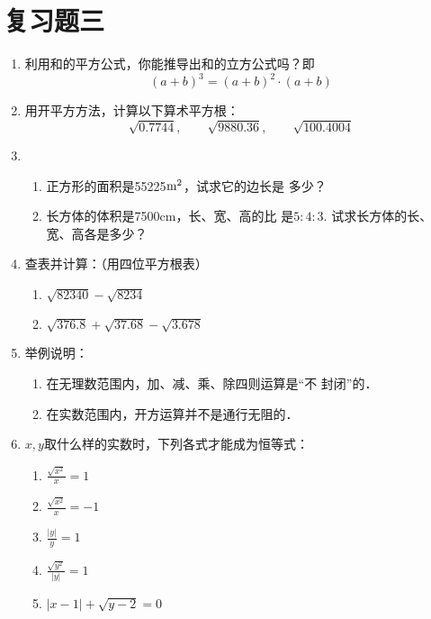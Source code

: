 \section*{复习题三}
\begin{enumerate}
    \item 利用和的平方公式，你能推导出和的立方公式吗？即
    \[(a+b)^3=(a+b)^2\cdot (a+b)\]
    \item 用开平方方法，计算以下算术平方根：
    $$\sqrt{0.7744},\qquad \sqrt{9880.36},\qquad \sqrt{100.4004}$$
  \item 
    \begin{enumerate}
        \item 正方形的面积是55225${\rm m^2}$，试求它的边长是
多少？
\item 长方体的体积是7500cm，长、宽、高的比
是$5:4:3$. 试求长方体的长、宽、高各是多少？
    \end{enumerate}
    
    
\item 查表并计算：（用四位平方根表）
\begin{enumerate}
    \item $\sqrt{82340}-\sqrt{8234}$
    \item $\sqrt{376.8}+\sqrt{37.68} -\sqrt{3.678}$
\end{enumerate}

\item 举例说明：
\begin{enumerate}
    \item 在无理数范围内，加、减、乘、除四则运算是“不
封闭”的．
\item 在实数范围内，开方运算并不是通行无阻的．
\end{enumerate}

\item $x,y$取什么样的实数时，下列各式才能成为恒等式：
\begin{multicols}{2}
    \begin{enumerate}
        \item $\frac{\sqrt{x^2}}{x}=1$
        \item $\frac{\sqrt{x^2}}{x}=-1$
        \item $\frac{|y|}{y}=1$
        \item $\frac{\sqrt{y^2}}{|y|}=1$
        \item $|x-1|+\sqrt{y-2}=0$
    \end{enumerate}
\end{multicols}




\end{enumerate}
